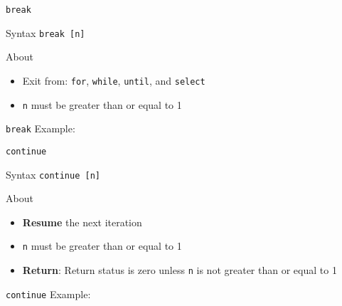 \documentclass[10pt, compress, aspectratio=169]{beamer}
\begin{document}
\begin{frame}{\texttt{break}}
  \begin{alertblock}{Syntax}
    \texttt{break [n]}
  \end{alertblock}

  \begin{exampleblock}{About}
    \begin{itemize}
      \item Exit from: \texttt{for}, \texttt{while},
            \texttt{until}, and \texttt{select}
      \item \texttt{n} must be greater than or equal to 1
    \end{itemize}
  \end{exampleblock}
\end{frame}

\begin{frame}{\texttt{break}}
  Example:
  
\end{frame}

\begin{frame}{\texttt{continue}}
  \begin{alertblock}{Syntax}
    \texttt{continue [n]}
  \end{alertblock}

  \begin{exampleblock}{About}
    \begin{itemize}
      \item \textbf{Resume} the next iteration
      \item \texttt{n} must be greater than or equal to 1
      \item \textbf{Return}: Return status is zero unless \texttt{n} is not
            greater than or equal to 1
    \end{itemize}
  \end{exampleblock}
\end{frame}

\begin{frame}{\texttt{continue}}
  Example:
  
\end{frame}
\end{document}
